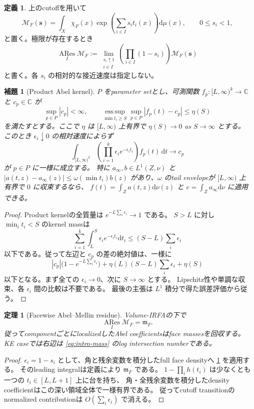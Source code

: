 \documentclass[11pt,a4paper]{ltjsarticle}
\newcommand{\dd}{\mathrm d}
\newcommand{\ARes}{\operatorname*{ARes}}
\theoremstyle{plain}
\newtheorem{theorem}{定理}[section]
\newtheorem{lemma}[lemma]{補題}
\theoremstyle{definition}
\newtheorem{definition}[definition]{定義}
\theoremstyle{remark}
\begin{document}
\begin{definition}
上のcutoffを用いて
\[
 \mathscr M_F(\bm s)=
 \int_X\chi_F(x)\exp\!\left(\sum_{i\in I}s_it_i(x)\right)\dd\mu(x),
 \qquad 0\le s_i<1,
\]
と置く。極限が存在するとき
\[
 \ARes_I\mathscr M_F
 :=
 \lim_{\substack{s_i\uparrow1\\i\in I}}
 \left(\prod_{i\in I}(1-s_i)\right)\mathscr M_F(\bm s)
\]
と書く。各 $s_i$ の相対的な接近速度は指定しない。
\end{definition}

\begin{lemma}[Product Abel kernel]
\label{lem:Abel}
$P$ をparameter setとし、可測関数 $f_p:[L,\infty)^k\to\mathbb C$ と
$c_p\in\mathbb C$ が
\[
 \sup_{p\in P}|c_p|<\infty,\qquad
 \operatorname*{ess\,sup}_{\min t_i\ge S}\sup_{p\in P}
 |f_p(t)-c_p|\le\eta(S)
\]
を満たすとする。ここで $\eta$ は $[L,\infty)$ 上有界で
$\eta(S)\to0$ as $S\to\infty$ とする。このとき
$\epsilon_i\downarrow0$ の相対速度によらず
\[
 \int_{[L,\infty)^k}
       \left(\prod_{i=1}^k\epsilon_i e^{-\epsilon_it_i}\right)
       f_p(t)\,\dd t
 \longrightarrow c_p
\]
が $p\in P$ に一様に成立する。
特に $a_\infty,b\in L^1(Z,\nu)$ と
$|a(t,z)-a_\infty(z)|\le\omega(\min t_i)b(z)$
があり、$\omega$ のtail envelopeが $[L,\infty)$ 上有界で $0$ に収束するなら、
$f(t)=\int_Za(t,z)\dd\nu(z)$ と $c=\int_Za_\infty\dd\nu$ に適用できる。
\end{lemma}
\begin{proof}
Product kernelの全質量は $e^{-L\sum_i\epsilon_i}\to1$ である。
$S>L$ に対し $\min_i t_i<S$ のkernel massは
\[
 \sum_{i=1}^k\int_L^S\epsilon_i e^{-\epsilon_i t_i}\dd t_i
 \le (S-L)\sum_i\epsilon_i
\]
以下である。従って左辺と $c_p$ の差の絶対値は、一様に
\[
 |c_p|\bigl(1-e^{-L\sum_i\epsilon_i}\bigr)
 +\eta(L)(S-L)\sum_i\epsilon_i+\eta(S)
\]
以下となる。まず全ての $\epsilon_i\to0$、次に $S\to\infty$ とする。
Lipschitz性や単調な収束、各 $\epsilon_i$ 間の比較は不要である。
最後の主張は $L^1$ 積分で得た誤差評価から従う。
\end{proof}

\begin{theorem}[Facewise Abel--Mellin residue]
\label{thm:Mellin}
Volume-IRFAの下で
\[
 \boxed{\ARes_I\mathscr M_F=\mathfrak m_F.}
\]
従ってcomponentごとにlocalizedしたAbel coefficientsはface massesを回収する。
KE caseでは右辺は \eqref{eq:intro-mass} のlog intersection numberである。
\end{theorem}
\begin{proof}
$\epsilon_i=1-s_i$ として、角と残余変数を積分したfull face densityへ
\cref{lem:Abel} を適用する。
そのleading integralは定義により $\mathfrak m_F$ である。
$1-\prod_i h(t_i)$ は少なくとも一つの $t_i\in[L,L+1]$ 上に台を持ち、
角・全残余変数を積分したdensity coefficientはこの深い領域全体で一様有界である。
従ってcutoff transitionのnormalized contributionは
$O(\sum_i\epsilon_i)$ で消える。
\end{proof}
\end{document}
